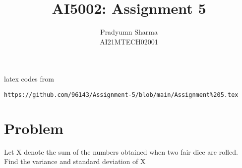 \documentclass[journal,12pt,twocolumn]{IEEEtran}
\begin{document}
\let\vec\mathbf
\renewcommand{\thefigure}{\theproblem}
\def\putbox#1#2#3{\makebox[0in][l]{\makebox[#1][l]{}\raisebox{\baselineskip}[0in][0in]{\raisebox{#2}[0in][0in]{#3}}}}
     \def\rightbox#1{\makebox[0in][r]{#1}}
     \def\centbox#1{\makebox[0in]{#1}}
     \def\topbox#1{\raisebox{-\baselineskip}[0in][0in]{#1}}
     \def\midbox#1{\raisebox{-0.5\baselineskip}[0in][0in]{#1}}
\vspace{3cm}
\title{AI5002: Assignment 5}
\author{Pradyumn Sharma\\ AI21MTECH02001}
\maketitle
\newpage
\bigskip
\renewcommand{\thefigure}{\theenumi}
\renewcommand{\thetable}{\theenumi}
%
latex codes from 
%
\begin{lstlisting}
https://github.com/96143/Assignment-5/blob/main/Assignment%205.tex
\end{lstlisting}

\section{Problem}
Let X denote the sum of the numbers obtained
when two fair dice are rolled. Find the
variance and standard deviation of X
\end{document}
